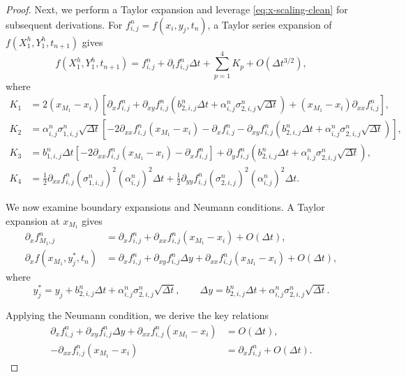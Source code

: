 \documentclass[11pt]{article}
\theoremstyle{mythm}
\theoremstyle{definition}
\begin{document}
\begin{proof}
		Next, we perform a Taylor expansion and leverage \eqref{eq:x-scaling-clean} for subsequent derivations. For $f_{i,j}^n=f(x_i,y_j,t_n)$, a Taylor series expansion of $f(X_1^h,Y_1^h,t_{n+1})$ gives
		\begin{equation}
			\label{eq:taylor-expanded-clean}
			f(X_1^h,Y_1^h,t_{n+1})
			=
			f_{i,j}^n
			+\partial_t f_{i,j}^n\Delta t
			+\sum_{p=1}^4 K_p+O(\Delta t^{3/2}),
		\end{equation}
		where
		\begin{equation} \label{kp}
			\begin{aligned}
				K_1 &= 2(x_{M_1} - x_i) \left[
				\partial_x f_{i,j}^n
				+ \partial_{xy} f_{i,j}^n (b_{2,i,j}^n\Delta t + \alpha_{i,j}^n\sigma_{2,i,j}^n\sqrt{\Delta t})
				+ (x_{M_1} - x_i) \partial_{xx} f_{i,j}^n
				\right], \\
				K_2 &= \alpha_{i,j}^n \sigma_{1,i,j}^n \sqrt{\Delta t} \left[
				-2\partial_{xx} f_{i,j}^n(x_{M_1}-x_i)
				- \partial_x f_{i,j}^n
				- \partial_{xy} f_{i,j}^n(b_{2,i,j}^n\Delta t + \alpha_{i,j}^n\sigma_{2,i,j}^n\sqrt{\Delta t})
				\right], \\
				K_3 &= b_{1,i,j}^n\Delta t\left[
				-2\partial_{xx}f_{i,j}^n(x_{M_1}-x_i)
				- \partial_x f_{i,j}^n
				\right]
				+ \partial_y f_{i,j}^n(b_{2,i,j}^n\Delta t + \alpha_{i,j}^n\sigma_{2,i,j}^n\sqrt{\Delta t}), \\
				K_4 &= \tfrac12 \partial_{xx} f_{i,j}^n(\sigma_{1,i,j}^n)^2(\alpha_{i,j}^n)^2\Delta t
				+ \tfrac12 \partial_{yy} f_{i,j}^n(\sigma_{2,i,j}^n)^2(\alpha_{i,j}^n)^2\Delta t.
			\end{aligned}
		\end{equation}
		
		
		
		We now examine boundary expansions and Neumann conditions. A Taylor expansion at $x_{M_1}$ gives
		\[
		\begin{aligned}
			\partial_x f_{M_1,j}^n
			&= \partial_x f_{i,j}^n
			+\partial_{xx}f_{i,j}^n(x_{M_1}-x_i)
			+O(\Delta t), \\
			\partial_x f(x_{M_1}, y_j^*, t_n)
			&= \partial_x f_{i,j}^n
			+ \partial_{xy} f_{i,j}^n\Delta y
			+ \partial_{xx} f_{i,j}^n(x_{M_1}-x_i)
			+ O(\Delta t),
		\end{aligned}
		\]
		where
		\[
		y_j^* = y_j + b_{2,i,j}^n\Delta t + \alpha_{i,j}^n\sigma_{2,i,j}^n\sqrt{\Delta t},
		\qquad
		\Delta y = b_{2,i,j}^n\Delta t + \alpha_{i,j}^n\sigma_{2,i,j}^n\sqrt{\Delta t}.
		\]
		
		Applying the Neumann condition, we derive the key relations
		\begin{equation}
			\label{eq:key-boundary-clean}
			\begin{aligned}
				\partial_x f_{i,j}^n 
				+ \partial_{xy} f_{i,j}^n\Delta y
				+ \partial_{xx} f_{i,j}^n(x_{M_1}-x_i)
				&= O(\Delta t),\\
				-\partial_{xx} f_{i,j}^n(x_{M_1}-x_i)
				&= \partial_x f_{i,j}^n + O(\Delta t).
			\end{aligned}
		\end{equation}
		

\end{proof}
\end{document}
